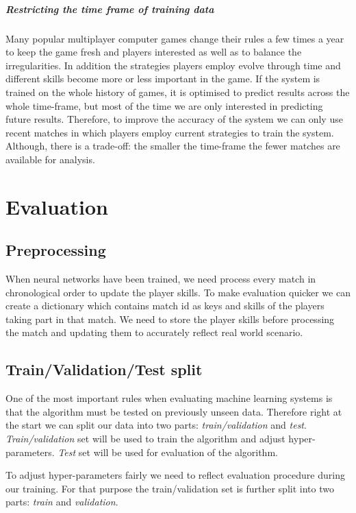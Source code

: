 \documentclass[12pt,a4paper]{book}
\begin{document}
\paragraph{Restricting the time frame of training data}
Many popular multiplayer computer games change their rules a few times a year to keep the game fresh and players interested as well as to balance the irregularities.
In addition the strategies players employ evolve through time and different skills become more or less important in the game.
If the system is trained on the whole history of games, it is optimised to predict results across the whole time-frame, but most of the time we are only interested in predicting future results.
Therefore, to improve the accuracy of the system we can only use recent matches in which players employ current strategies to train the system.
Although, there is a trade-off: the smaller the time-frame the fewer matches are available for analysis.



\chapter{Evaluation}
\section{Preprocessing}
When neural networks have been trained, we need process every match in chronological order to update the player skills.
To make evaluation quicker we can create a dictionary which contains match id as keys and skills of the players taking part in that match.
We need to store the player skills before processing the match and updating them to accurately reflect real world scenario.
\section{Train/Validation/Test split}
One of the most important rules when evaluating machine learning systems is that the algorithm must be tested on previously unseen data.
Therefore right at the start we can split our data into two parts: \emph{train/validation} and \emph{test}.
\emph{Train/validation} set will be used to train the algorithm and adjust hyper-parameters.
\emph{Test} set will be used for evaluation of the algorithm.

To adjust hyper-parameters fairly we need to reflect evaluation procedure during our training.
For that purpose the train/validation set is further split into two parts: \emph{train} and \emph{validation}.
\end{document}
